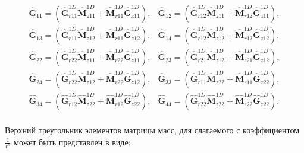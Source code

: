 \begin{equation*}
	\begin{array}{ll}
		\hat{\textbf{G}}_{11} = \left(\hat{\textbf{G}}^{1D}_{r11}\hat{\textbf{M}}^{1D}_{z11} + \hat{\textbf{M}}^{1D}_{r11}\hat{\textbf{G}}^{1D}_{z11}\right), & \hat{\textbf{G}}_{12} = \left(\hat{\textbf{G}}^{1D}_{r12}\hat{\textbf{M}}^{1D}_{z11} + \hat{\textbf{M}}^{1D}_{r12}\hat{\textbf{G}}^{1D}_{z11}\right),\\
		\hat{\textbf{G}}_{13} = \left(\hat{\textbf{G}}^{1D}_{r11}\hat{\textbf{M}}^{1D}_{z12} + \hat{\textbf{M}}^{1D}_{r11}\hat{\textbf{G}}^{1D}_{z12}\right), & \hat{\textbf{G}}_{14} = \left(\hat{\textbf{G}}^{1D}_{r12}\hat{\textbf{M}}^{1D}_{z12} +\hat{\textbf{M}}^{1D}_{r12}\hat{\textbf{G}}^{1D}_{z12}\right),\\
		\hat{\textbf{G}}_{22} = \left(\hat{\textbf{G}}^{1D}_{r22}\hat{\textbf{M}}^{1D}_{z11} + \hat{\textbf{M}}^{1D}_{r22}\hat{\textbf{G}}^{1D}_{z11}\right), & \hat{\textbf{G}}_{23} = \left(\hat{\textbf{G}}^{1D}_{r21}\hat{\textbf{M}}^{1D}_{z12} +\hat{\textbf{M}}^{1D}_{r21}\hat{\textbf{G}}^{1D}_{z12}\right),\\
		\hat{\textbf{G}}_{24} = \left(\hat{\textbf{G}}^{1D}_{r22}\hat{\textbf{M}}^{1D}_{z12} + \hat{\textbf{M}}^{1D}_{r22}\hat{\textbf{G}}^{1D}_{z12}\right), & \hat{\textbf{G}}_{33} = \left(\hat{\textbf{G}}^{1D}_{r11}\hat{\textbf{M}}^{1D}_{z22} + \hat{\textbf{M}}^{1D}_{r11}\hat{\textbf{G}}^{1D}_{z22}\right),\\
		\hat{\textbf{G}}_{34} = \left(\hat{\textbf{G}}^{1D}_{r12}\hat{\textbf{M}}^{1D}_{z22} + \hat{\textbf{M}}^{1D}_{r12}\hat{\textbf{G}}^{1D}_{z22}\right), & \hat{\textbf{G}}_{44} = \left(\hat{\textbf{G}}^{1D}_{r22}\hat{\textbf{M}}^{1D}_{z22} + \hat{\textbf{M}}^{1D}_{r22}\hat{\textbf{G}}^{1D}_{z22}\right).\\
	\end{array}
\end{equation*}

Верхний треугольник элементов матрицы масс, для слагаемого с коэффициентом $\frac{1}{r^2}$ может быть представлен в виде:

